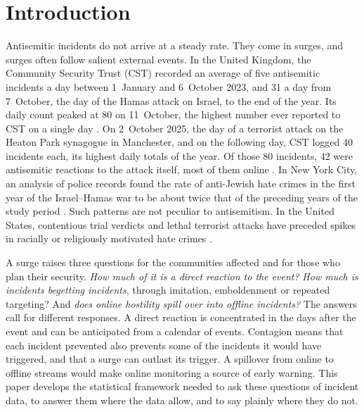 \section{Introduction}\label{sec:intro}

Antisemitic incidents do not arrive at a steady rate. They come in surges,
and surges often follow salient external events. In the United Kingdom, the
Community Security Trust (CST) recorded an average of five antisemitic
incidents a day between 1~January and 6~October 2023, and 31 a day from
7~October, the day of the Hamas attack on Israel, to the end of the year. Its
daily count peaked at 80 on 11~October, the highest number ever reported to
CST on a single day \citep{cst2024incidents}. On 2~October 2025, the day of
a terrorist attack on the Heaton Park synagogue in Manchester, and on the
following day, CST logged 40 incidents each, its highest daily totals of the
year. Of those 80 incidents, 42 were antisemitic reactions to the attack
itself, most of them online \citep{cst2026incidents}. In New York City, an analysis of police
records found the rate of anti-Jewish hate crimes in the first year of the
Israel--Hamas war to be about twice that of the preceding years of the study
period \citep{rosenbaum2025}. Such patterns are not peculiar to antisemitism.
In the United States, contentious trial verdicts and lethal terrorist attacks
have preceded spikes in racially or religiously motivated hate crimes
\citep{king2013}.

A surge raises three questions for the communities affected and for those
who plan their security. \emph{How much of it is a direct reaction to the
event?} \emph{How much is incidents begetting incidents}, through imitation,
emboldenment or repeated targeting? And \emph{does online hostility spill
over into offline incidents?} The answers call for different responses. A
direct reaction is concentrated in the days after the event and can be
anticipated from a calendar of events. Contagion means that each incident
prevented also prevents some of the incidents it would have triggered, and
that a surge can outlast its trigger. A spillover from online to offline
streams would make online monitoring a source of early warning. This paper
develops the statistical framework needed to ask these questions of incident
data, to answer them where the data allow, and to say plainly where they do
not.

%
